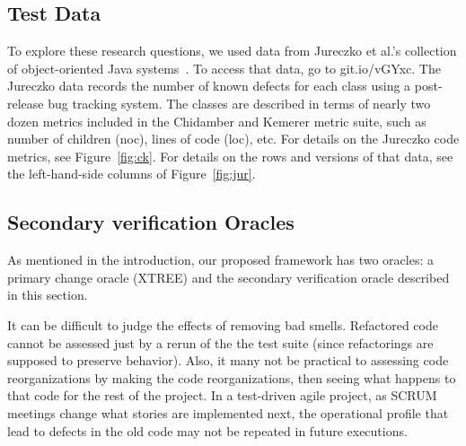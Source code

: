 \documentclass[twocolumn,5p]{elsarticle}
\newcommand{\fig}[1]{Figure~\ref{fig:#1}}
\theoremstyle{break}
\begin{document}
\begin{itemize}
		
		
		
		
		\subsection{Test Data}\label{sect:tesd}
		
		To explore these research questions,
		we used data from
		Jureczko et al.'s collection of object-oriented Java systems~\cite{jureczko10}. To access that data, go to   git.io/vGYxc.
		The Jureczko data records the number of known defects for each class using a post-release bug tracking system. The classes are described in terms of nearly two dozen metrics included in the Chidamber and Kemerer metric suite, such as number of children (noc), lines of code (loc), etc. For details on the Jureczko code
		metrics, see  \fig{ck}. For details on the rows and versions
		of that data, see the left-hand-side columns of \fig{jur}.
		
		
		
		
		\subsection{Secondary verification Oracles}
		\label{sect:eval}
		
		As mentioned in the introduction, our proposed framework has two oracles:
		a primary change oracle (XTREE) and the secondary verification oracle described in this section.
		
		It can be difficult  to judge the  effects of removing bad smells.
		Refactored code cannot be assessed just by a rerun of the the test
		suite (since refactorings are supposed to preserve behavior). 
		Also, it many not be practical
		to assessing code reorganizations by making the
		code reorganizations,  then seeing what happens to that code for the rest
		of the project. In a test-driven agile project, as
		SCRUM meetings change what stories are implemented next,
		the operational profile that lead to defects in the old
		code may not be repeated in future executions. 
		

\end{itemize}
\end{document}
